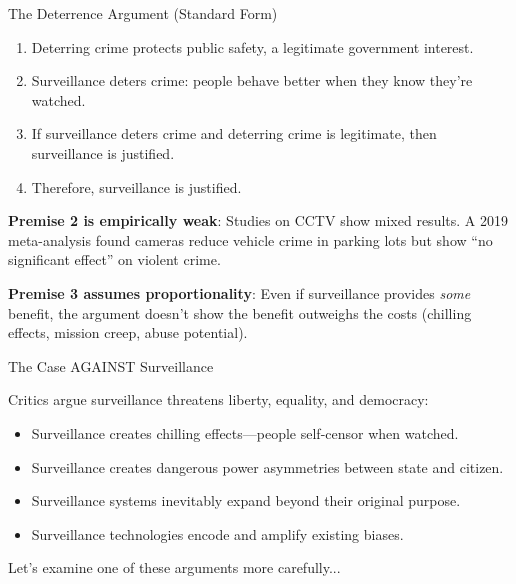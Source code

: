 ﻿\documentclass[aspectratio=169,11pt]{beamer}
\begin{document}
\begin{frame}{The Deterrence Argument (Standard Form)}
\begin{probox}
\small
\begin{enumerate}
    \item Deterring crime protects public safety, a legitimate government interest.
    \item Surveillance deters crime: people behave better when they know they're watched.
    \item If surveillance deters crime and deterring crime is legitimate, then surveillance is justified.
    \item Therefore, surveillance is justified.
\end{enumerate}
\end{probox}

\vspace{0.1em}
\begin{objectionbox}[Critique]
\scriptsize
\textbf{Premise 2 is empirically weak}: Studies on CCTV show mixed results. A 2019 meta-analysis found cameras reduce vehicle crime in parking lots but show ``no significant effect'' on violent crime.

\textbf{Premise 3 assumes proportionality}: Even if surveillance provides \emph{some} benefit, the argument doesn't show the benefit outweighs the costs (chilling effects, mission creep, abuse potential).
\end{objectionbox}
\end{frame}

\begin{frame}{The Case AGAINST Surveillance}
\begin{objectionbox}
\small
Critics argue surveillance threatens liberty, equality, and democracy:
\begin{itemize}
    \item Surveillance creates chilling effects---people self-censor when watched.
    \item Surveillance creates dangerous power asymmetries between state and citizen.
    \item Surveillance systems inevitably expand beyond their original purpose.
    \item Surveillance technologies encode and amplify existing biases.
\end{itemize}
\end{objectionbox}

\vspace{0.3em}
Let's examine one of these arguments more carefully...
\end{frame}
\end{document}
